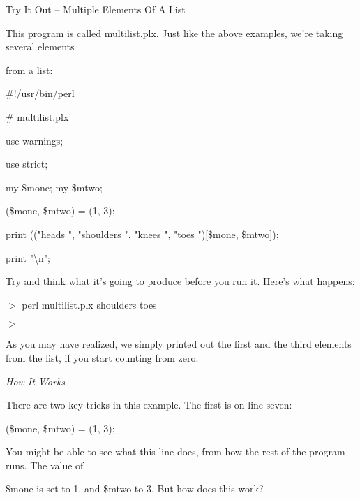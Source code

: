 \documentclass[a4paper,11pt]{book}
\begin{document}
\noindent 

\noindent Try It Out -- Multiple Elements Of A List

\noindent 

\noindent This program is called multilist.plx. Just like the above examples, we're taking several elements

\noindent from a list:

\noindent 

\noindent \#!/usr/bin/perl

\noindent \# multilist.plx

\noindent use warnings;

\noindent use strict;

\noindent 

\noindent my \$mone; my \$mtwo;

\noindent (\$mone, \$mtwo) = (1, 3);

\noindent 

\noindent print (("heads ", "shoulders ", "knees ", "toes ")[\$mone, \$mtwo]);

\noindent print "\textbackslash n";

\noindent 

\noindent 

\noindent Try and think what it's going to produce before you run it. Here's what happens:

\noindent 

\noindent $>$ perl multilist.plx shoulders toes

\noindent $>$

\noindent 

\noindent As you may have realized, we simply printed out the first and the third elements from the list, if you start counting from zero.

\noindent 

\noindent \textit{How It Works}

\noindent There are two key tricks in this example. The first is on line seven:

\noindent 

\noindent 

\noindent (\$mone, \$mtwo) = (1, 3);

\noindent 

\noindent You might be able to see what this line does, from how the rest of the program runs. The value of

\noindent \$mone is set to 1, and \$mtwo to 3. But how does this work?

\noindent 
\end{document}
